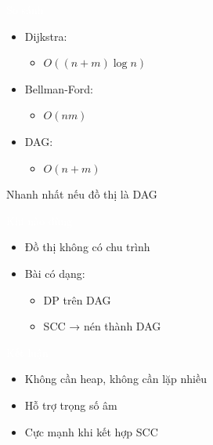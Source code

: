 \documentclass{beamer}
\newcommand{\hlgreen}[1]{\textcolor{mygreen}{#1}}
\newcommand{\hlpurple}[1]{\textcolor{mypurple}{#1}}
\newcommand{\hlwhite}[1]{\textcolor{white}{#1}}
\begin{document}

\begin{frame}{\hlwhite{So sánh}}
\begin{itemize}
\item Dijkstra:
\begin{itemize}
\item $O((n+m)\log n)$
\end{itemize}

\item Bellman-Ford:
\begin{itemize}
\item $O(nm)$
\end{itemize}

\item DAG:
\begin{itemize}
\item \hlgreen{$O(n + m)$}
\end{itemize}
\end{itemize}

\begin{tcolorbox}
\centering
\hlpurple{Nhanh nhất nếu đồ thị là DAG}
\end{tcolorbox}
\end{frame}


\begin{frame}{\hlwhite{Khi nào dùng}}
\begin{itemize}
\item Đồ thị không có chu trình
\item Bài có dạng:
\begin{itemize}
\item DP trên DAG
\item SCC → nén thành DAG
\end{itemize}
\end{itemize}
\end{frame}


\begin{frame}{\hlwhite{Kết luận}}
\begin{itemize}
\item Không cần heap, không cần lặp nhiều
\item Hỗ trợ trọng số âm
\item Cực mạnh khi kết hợp SCC
\end{itemize}
\end{frame}
\end{document}
